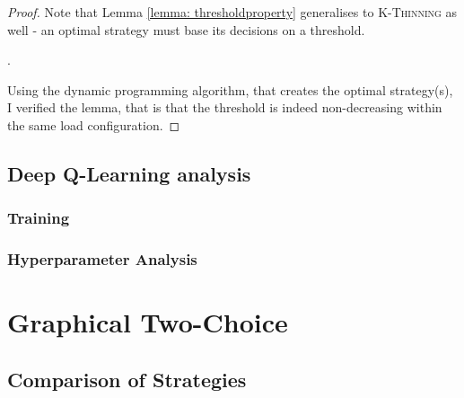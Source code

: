 \begin{proof}
Note that Lemma \ref{lemma: thresholdproperty} generalises to \textsc{K-Thinning} as well - an optimal strategy must base its decisions on a threshold.


.


Using the dynamic programming algorithm, that creates the optimal strategy(s), I verified the lemma, that is that the threshold is indeed non-decreasing within the same load configuration.
\end{proof}


\subsection{Deep Q-Learning analysis}


\subsubsection{Training}


\subsubsection{Hyperparameter Analysis}



\section{Graphical Two-Choice}


\subsection{Comparison of Strategies}

